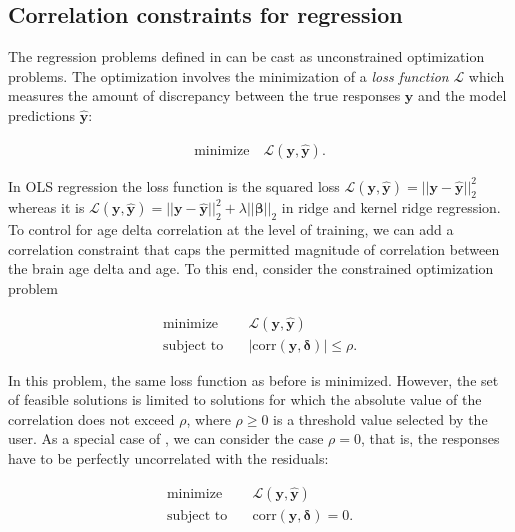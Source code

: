 \documentclass[utf8]{frontiersSCNS} %
\renewcommand{\b}{\boldsymbol{\beta}} %
\newcommand{\corr}{\text{corr}}
\renewcommand{\d}{\boldsymbol{\delta}}
\renewcommand{\L}{\mathcal{L}}
\newcommand{\yhat}{\hat{y}}
\newcommand{\y}{\mathbf{y}}
\newcommand{\yh}{\mathbf{\hat{y}}}
\begin{document}
\subsection{Correlation constraints for regression}\label{sec:correlation_constraints}


The regression problems defined in  can be cast as  unconstrained optimization problems. The optimization involves the minimization of a \textit{loss function} $\L$ which measures the amount of discrepancy between the true responses $\y$ and the model predictions $\yh$:

\begin{equation}\label{eq:unconstrained_problem}
\begin{split}
    \text{minimize}\quad \L(\y,\yh).
\end{split}
\end{equation}

In OLS regression the loss function is the squared loss $\L(\y,\yh)=||\y-\yh||_2^2$ whereas it is $\L(\y,\yh)=||\y-\yh||_2^2 + \lambda||\b||_2$ in ridge and kernel ridge regression. To control for age delta correlation at the level of training, we can add a correlation constraint that caps the permitted magnitude of correlation between the brain age delta and age. To this end, consider the constrained optimization problem

\begin{equation}\label{eq:constrained_problem_bounded}
\begin{split}
    \text{minimize}\quad& \L(\y,\yh)\\
\text{subject to}\quad&   |\corr(\y,\d)| \le \rho.
\end{split}
\end{equation}

In this problem, the same loss function as before is minimized. However, the set of feasible solutions is limited to solutions for which the absolute value of the correlation does not exceed $\rho$, where $\rho\ge0$ is a threshold value selected by the user. As a special case of , we can consider the case $\rho=0$, that is, the responses have to be perfectly uncorrelated with the residuals: 

\begin{equation}\label{eq:constrained_problem_zero}
\begin{split}
    \text{minimize}\quad& \L(\y,\yh)\\
    \text{subject to}\quad&  \corr(\y,\d) = 0.
\end{split}
\end{equation}
\end{document}
